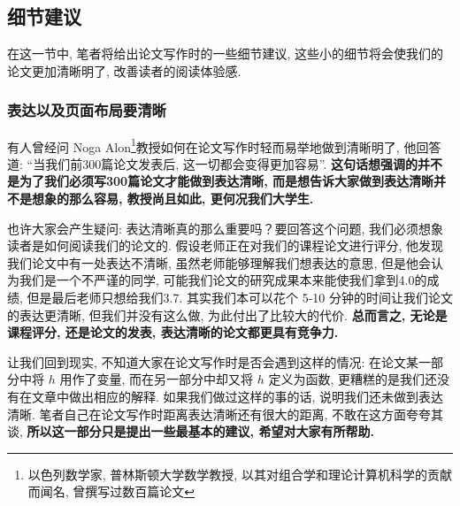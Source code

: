 \documentclass{formatBook}
\begin{document}
\subsection{细节建议}
在这一节中, 笔者将给出论文写作时的一些细节建议, 这些小的细节将会使我们的论文更加清晰明了, 改善读者的阅读体验感. 
\subsubsection{表达以及页面布局要清晰}
有人曾经问 Noga Alon\footnote{以色列数学家, 普林斯顿大学数学教授, 以其对组合学和理论计算机科学的贡献而闻名, 曾撰写过数百篇论文}教授如何在论文写作时轻而易举地做到清晰明了, 他回答道: “当我们前300篇论文发表后, 这一切都会变得更加容易”\cite{pakhow}. \textbf{这句话想强调的并不是为了我们必须写300篇论文才能做到表达清晰, 而是想告诉大家做到表达清晰并不是想象的那么容易, 教授尚且如此, 更何况我们大学生.} \par
也许大家会产生疑问: 表达清晰真的那么重要吗？要回答这个问题, 我们必须想象读者是如何阅读我们的论文的. 假设老师正在对我们的课程论文进行评分, 他发现我们论文中有一处表达不清晰, 虽然老师能够理解我们想表达的意思, 但是他会认为我们是一个不严谨的同学, 可能我们论文的研究成果本来能使我们拿到4.0的成绩, 但是最后老师只想给我们3.7. 其实我们本可以花个 5-10 分钟的时间让我们论文的表达更清晰, 但我们并没有这么做, 为此付出了比较大的代价. \textbf{总而言之, 无论是课程评分, 还是论文的发表, 表达清晰的论文都更具有竞争力.} \par
让我们回到现实, 不知道大家在论文写作时是否会遇到这样的情况: 在论文某一部分中将 $h$ 用作了变量, 而在另一部分中却又将 $h$ 定义为函数, 更糟糕的是我们还没有在文章中做出相应的解释. 如果我们做过这样的事的话, 说明我们还未做到表达清晰. 笔者自己在论文写作时距离表达清晰还有很大的距离, 不敢在这方面夸夸其谈, \textbf{所以这一部分只是提出一些最基本的建议, 希望对大家有所帮助. }
\end{document}
